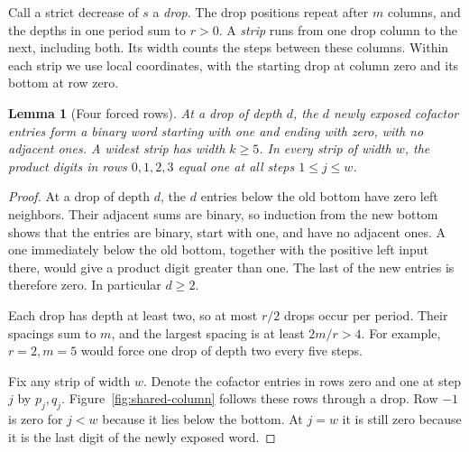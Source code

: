 \documentclass[11pt,reqno]{amsart}
\newtheorem{lemma}[theorem]{Lemma}
\begin{document}
Call a strict decrease of \(s\) a \emph{drop}. The drop positions repeat after \(m\) columns, and the depths in one period sum to \(r>0\). A \emph{strip} runs from one drop column to the next, including both. Its width counts the steps between these columns. Within each strip we use local coordinates, with the starting drop at column zero and its bottom at row zero.

\begin{lemma}[Four forced rows]\label{lem:strip}
At a drop of depth \(d\), the \(d\) newly exposed cofactor entries form a binary word starting with one and ending with zero, with no adjacent ones. A widest strip has width \(k\ge5\). In every strip of width \(w\), the product digits in rows \(0,1,2,3\) equal one at all steps \(1\le j\le w\).
\end{lemma}
\begin{proof}
At a drop of depth \(d\), the \(d\) entries below the old bottom have zero left neighbors. Their adjacent sums are binary, so induction from the new bottom shows that the entries are binary, start with one, and have no adjacent ones. A one immediately below the old bottom, together with the positive left input there, would give a product digit greater than one. The last of the new entries is therefore zero. In particular \(d\ge2\).

Each drop has depth at least two, so at most \(r/2\) drops occur per period. Their spacings sum to \(m\), and the largest spacing is at least \(2m/r>4\). For example, \(r=2,m=5\) would force one drop of depth two every five steps.

Fix any strip of width \(w\). Denote the cofactor entries in rows zero and one at step \(j\) by \(p_j,q_j\). Figure~\ref{fig:shared-column} follows these rows through a drop. Row \(-1\) is zero for \(j<w\) because it lies below the bottom. At \(j=w\) it is still zero because it is the last digit of the newly exposed word.


\end{proof}
\end{document}
